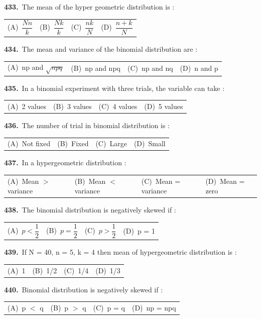 \documentclass[11pt,a4paper]{article}
\makeatletter
\newcommand{\mcq}[6]{%
  \Needspace{4\baselineskip}%
  \par\medskip\noindent\textbf{#1.}\ #2\par\nopagebreak
  \noindent\begin{tabularx}{\linewidth}{@{\hspace{1.5em}}*{4}{>{\raggedright\arraybackslash}X}@{}}
    (A)~#3 & (B)~#4 & (C)~#5 & (D)~#6
  \end{tabularx}\par}
\makeatother
\begin{document}
\mcq{433}{The mean of the hyper geometric distribution is :}{$\dfrac{Nn}{k}$}{$\dfrac{Nk}{k}$}{$\dfrac{nk}{N}$}{$\dfrac{n+k}{N}$}
\mcq{434}{The mean and variance of the binomial distribution are :}{np and $\sqrt{npq}$}{np and npq}{np and nq}{n and p}
\mcq{435}{In a binomial experiment with three trials, the variable can take :}{2 values}{3 values}{4 values}{5 values}
\mcq{436}{The number of trial in binomial distribution is :}{Not fixed}{Fixed}{Large}{Small}
\mcq{437}{In a hypergeometric distribution :}{Mean $>$ variance}{Mean $<$ variance}{Mean = variance}{Mean = zero}
\mcq{438}{The binomial distribution is negatively skewed if :}{$p<\dfrac{1}{2}$}{$p=\dfrac{1}{2}$}{$p>\dfrac{1}{2}$}{p = 1}
\mcq{439}{If N = 40, n = 5, k = 4 then mean of hypergeometric distribution is :}{1}{1/2}{1/4}{1/3}
\mcq{440}{Binomial distribution is negatively skewed if :}{p $<$ q}{p $>$ q}{p = q}{np = npq}
\end{document}
